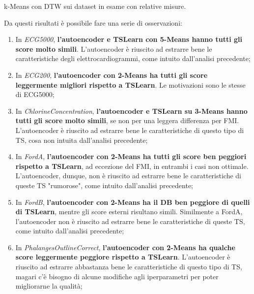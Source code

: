 \begin{center}
	\begin{table}[H]
		\centering
		\caption{k-Means con DTW sui dataset in esame con relative misure.}
	\end{table}
\end{center}

Da questi risultati è possibile fare una serie di osservazioni:
\begin{enumerate}
	\item In \textit{ECG5000}, \textbf{l'autoencoder e TSLearn con 5-Means hanno tutti gli score molto simili}.
	L'autoencoder è riuscito ad estrarre bene le caratteristiche degli elettrocardiogrammi, come intuito dall'analisi precedente;

	\item In \textit{ECG200}, \textbf{l'autoencoder con 2-Means ha tutti gli score leggermente migliori rispetto a TSLearn}.
	Le motivazioni sono le stesse di ECG5000;

	\item In \textit{ChlorineConcentration}, \textbf{l'autoencoder e TSLearn su 3-Means hanno tutti gli score molto simili}, se non per una leggera differenza per FMI.
	L'autoencoder è riuscito ad estrarre bene le caratteristiche di questo tipo di TS, cosa non intuita dall'analisi precedente;

	\item In \textit{FordA}, \textbf{l'autoencoder con 2-Means ha tutti gli score ben peggiori rispetto a TSLearn}, ad eccezione del FMI, in entrambi i casi non ottimale. L'autoencoder, dunque, non è riuscito ad estrarre bene le caratteristiche di queste TS "rumorose", come intuito dall'analisi precedente;

	\item In \textit{FordB}, \textbf{l'autoencoder con 2-Means ha il DB ben peggiore di quelli di TSLearn}, mentre gli score esterni risultano simili.
	Similmente a FordA, l'autoencoder non è riuscito ad estrarre bene le caratteristiche di queste TS, come intuito dall'analisi precedente;

	\item In \textit{PhalangesOutlineCorrect}, \textbf{l'autoencoder con 2-Means ha qualche score leggermente peggiore rispetto a TSLearn}.
	L'autoencoder è riuscito ad estrarre abbastanza bene le caratteristiche di questo tipo di TS, magari c'è bisogno di alcune modifiche agli iperparametri per poter migliorarne la qualità;


\end{enumerate}
